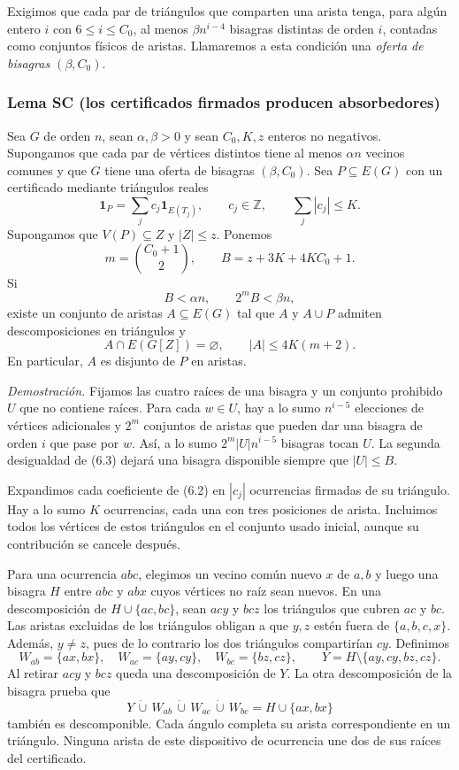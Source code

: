 \documentclass[spanish,11pt,a4paper]{article}
\begin{document}
Exigimos que cada par de triángulos que comparten una arista tenga, para algún entero \(i\) con \(6\le i\le C_0\), al menos \(\beta n^{i-4}\) bisagras distintas de orden \(i\), contadas como conjuntos físicos de aristas. Llamaremos a esta condición una \emph{oferta de bisagras \((\beta,C_0)\)}.

\subsubsection{Lema SC (los certificados firmados producen absorbedores)}\label{lema-sc-los-certificados-firmados-producen-absorbedores}

Sea \(G\) de orden \(n\), sean \(\alpha,\beta>0\) y sean \(C_0,K,z\) enteros no negativos. Supongamos que cada par de vértices distintos tiene al menos \(\alpha n\) vecinos comunes y que \(G\) tiene una oferta de bisagras \((\beta,C_0)\). Sea \(P\subseteq E(G)\) con un certificado mediante triángulos reales \[\mathbf1_P=\sum_j c_j\mathbf1_{E(T_j)},\qquad c_j\in\mathbb Z,
\qquad \sum_j|c_j|\le K.
\tag{6.2}\] Supongamos que \(V(P)\subseteq Z\) y \(|Z|\le z\). Ponemos \[m=\binom{C_0+1}{2},\qquad B=z+3K+4KC_0+1.\] Si \[B<\alpha n,\qquad 2^mB<\beta n,
\tag{6.3}\] existe un conjunto de aristas \(A\subseteq E(G)\) tal que \(A\) y \(A\cup P\) admiten descomposiciones en triángulos y \[A\cap E(G[Z])=\varnothing,\qquad |A|\le4K(m+2).
\tag{6.4}\] En particular, \(A\) es disjunto de \(P\) en aristas.

\emph{Demostración.} Fijamos las cuatro raíces de una bisagra y un conjunto prohibido \(U\) que no contiene raíces. Para cada \(w\in U\), hay a lo sumo \(n^{i-5}\) elecciones de vértices adicionales y \(2^m\) conjuntos de aristas que pueden dar una bisagra de orden \(i\) que pase por \(w\). Así, a lo sumo \(2^m|U|n^{i-5}\) bisagras tocan \(U\). La segunda desigualdad de (6.3) dejará una bisagra disponible siempre que \(|U|\le B\).

Expandimos cada coeficiente de (6.2) en \(|c_j|\) ocurrencias firmadas de su triángulo. Hay a lo sumo \(K\) ocurrencias, cada una con tres posiciones de arista. Incluimos todos los vértices de estos triángulos en el conjunto usado inicial, aunque su contribución se cancele después.

Para una ocurrencia \(abc\), elegimos un vecino común nuevo \(x\) de \(a,b\) y luego una bisagra \(H\) entre \(abc\) y \(abx\) cuyos vértices no raíz sean nuevos. En una descomposición de \(H\cup\{ac,bc\}\), sean \(acy\) y \(bcz\) los triángulos que cubren \(ac\) y \(bc\). Las aristas excluidas de los triángulos obligan a que \(y,z\) estén fuera de \(\{a,b,c,x\}\). Además, \(y\ne z\), pues de lo contrario los dos triángulos compartirían \(cy\). Definimos \[W_{ab}=\{ax,bx\},\quad W_{ac}=\{ay,cy\},\quad W_{bc}=\{bz,cz\},
\qquad Y=H\setminus\{ay,cy,bz,cz\}.
\tag{6.5}\] Al retirar \(acy\) y \(bcz\) queda una descomposición de \(Y\). La otra descomposición de la bisagra prueba que \[Y\,\dot\cup\,W_{ab}\,\dot\cup\,W_{ac}\,\dot\cup\,W_{bc}
=H\cup\{ax,bx\}
\tag{6.6}\] también es descomponible. Cada ángulo completa su arista correspondiente en un triángulo. Ninguna arista de este dispositivo de ocurrencia une dos de sus raíces del certificado.
\end{document}
